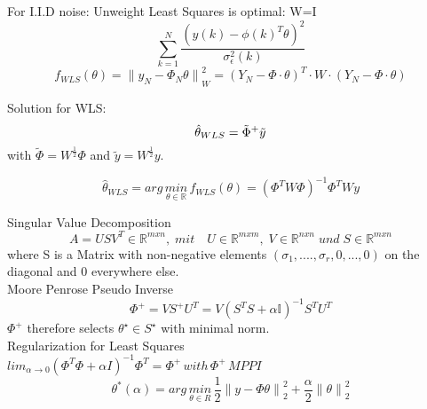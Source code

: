 \begin{tcolorbox}[colback=red!5!white,colframe=red!75!black,title=Weighted Least Squares (unitless)]
For I.I.D noise: Unweight Least Squares is optimal: W=I
\begin{equation*}
\sum _{ k=1 }^{ N }\frac {{{ (y(k)-{ \phi (k) }^{ T }\theta )}^{2  } }}{\sigma_{\epsilon}^{2}(k)}
\end{equation*}
\begin{equation*}
{ f }_{ WLS }(\theta )={ \parallel { y }_{ N }-{ \Phi  }_{ N }\theta \parallel  }_{ W }^{ 2 }={ ({ Y }_{ N }-\Phi \cdot \theta ) }^{ T }\cdot W\cdot  ({ Y }_{ N }-\Phi \cdot \theta )
\end{equation*}

Solution for WLS:
\begin{equation*}
\hat{\theta}_{WLS} = \tilde{\Phi}^+\tilde{y} \\
\end{equation*}
with $\tilde{\Phi} = W^{\frac{1}{2}} \Phi$ and $\tilde{y} = W^{\frac{1}{2}} y$.


\begin{equation*}
{ \hat{\theta} }_{ WLS }=arg\, \underset{ \theta \in \mathbb{R} }{ min }\,{f  }_{WLS  }(\theta)={ ({\Phi}^{T}W\Phi) }^{ -1 }{\Phi}^{T} Wy
\end{equation*}
\end{tcolorbox}
\begin{tcolorbox}[colback=red!5!white,colframe=red!75!black,title=Ill-Posed Least Squares]
	
Singular Value Decomposition
\begin{equation*}
A=US{ V }^{ T } \in\mathbb{{R}}^{mxn}, \; mit\quad U\in\mathbb{{R}}^{mxm}, \; V\in\mathbb{{R}}^{nxn} \; und \; S\in\mathbb{{R}}^{mxn}
\end{equation*}
where S is a Matrix with non-negative elements $(\sigma_1,....,\sigma_r, 0,...,0)$ on the diagonal and 0 everywhere else.\\
Moore Penrose Pseudo Inverse
\begin{equation*}
{ \Phi  }^{ + }=V{ S }^{+}{U}^{T} = V(S^TS+\alpha\mathbb{I})^{-1}S^TU^T
\end{equation*}
$\Phi^+$ therefore selects $\theta^\star \in S^\star$ with minimal norm.
\\

Regularization for Least Squares\\
\( { lim }_{ \alpha \rightarrow 0 }{ ({ \Phi  }^{ T }\Phi +\alpha { I }) }^{ -1 }{ \Phi  }^{ T }={ \Phi  }^{ + }\, with\,{ \Phi  }^{ + }\, MPPI \)
\begin{equation*}
{ \theta  }^{ * }(\alpha )=arg\, \underset { \theta \in { R } }{ min } \, \frac { 1 }{ 2 } {\parallel y-\Phi\theta \parallel}_{2}^{2}+\frac { \alpha }{ 2 } {\parallel \theta\parallel}_{2}^{2}
\end{equation*}
\end{tcolorbox}

